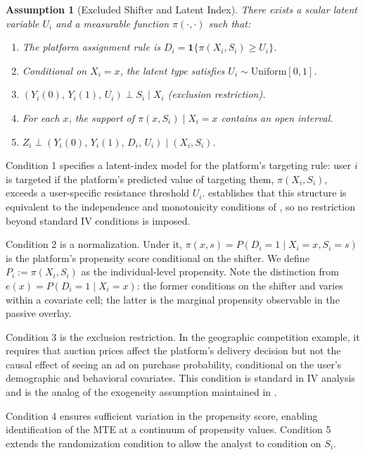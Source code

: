 \documentclass[11pt]{article}
\newtheorem{assumption}{Assumption}
\begin{document}
\begin{assumption}[Excluded Shifter and Latent Index]
\label{ass:excluded}
There exists a scalar latent variable $U_i$ and a measurable function $\pi(\cdot,\cdot)$
such that:
\begin{enumerate}
  \item The platform assignment rule is $D_i = \mathbf{1}\{\pi(X_i, S_i) \geq U_i\}$.
  \item Conditional on $X_i = x$, the latent type satisfies $U_i \sim
    \mathrm{Uniform}[0,1]$.
  \item $(Y_i(0),\, Y_i(1),\, U_i) \perp S_i \mid X_i$ \emph{(exclusion restriction)}.
  \item For each $x$, the support of $\pi(x, S_i) \mid X_i=x$ contains an open
    interval.
  \item $Z_i \perp (Y_i(0),\, Y_i(1),\, D_i,\, U_i) \mid (X_i, S_i)$.
\end{enumerate}
\end{assumption}

Condition 1 specifies a latent-index model for the platform's targeting rule:
user $i$ is targeted if the platform's predicted value of targeting them,
$\pi(X_i, S_i)$, exceeds a user-specific resistance threshold $U_i$.
\citet{vytlacil2002independence} establishes that this structure is equivalent
to the independence and monotonicity conditions of \citet{angrist1994identification},
so no restriction beyond standard IV conditions is imposed.

Condition 2 is a normalization.  Under it, $\pi(x,s) = P(D_i=1 \mid X_i=x,
S_i=s)$ is the platform's propensity score conditional on the shifter.  We
define $P_i := \pi(X_i, S_i)$ as the individual-level propensity.  Note the
distinction from $e(x) = P(D_i=1 \mid X_i=x)$: the former conditions on the
shifter and varies within a covariate cell; the latter is the marginal propensity
observable in the passive overlay.

Condition 3 is the exclusion restriction.  In the geographic competition
example, it requires that auction prices affect the platform's delivery
decision but not the causal effect of seeing an ad on purchase probability,
conditional on the user's demographic and behavioral covariates.  This condition
is standard in IV analysis and is the analog of the exogeneity assumption
maintained in \citet{waisman2025multicell}.

Condition 4 ensures sufficient variation in the propensity score, enabling
identification of the MTE at a continuum of propensity values.  Condition 5
extends the randomization condition to allow the analyst to condition on $S_i$.
\end{document}

